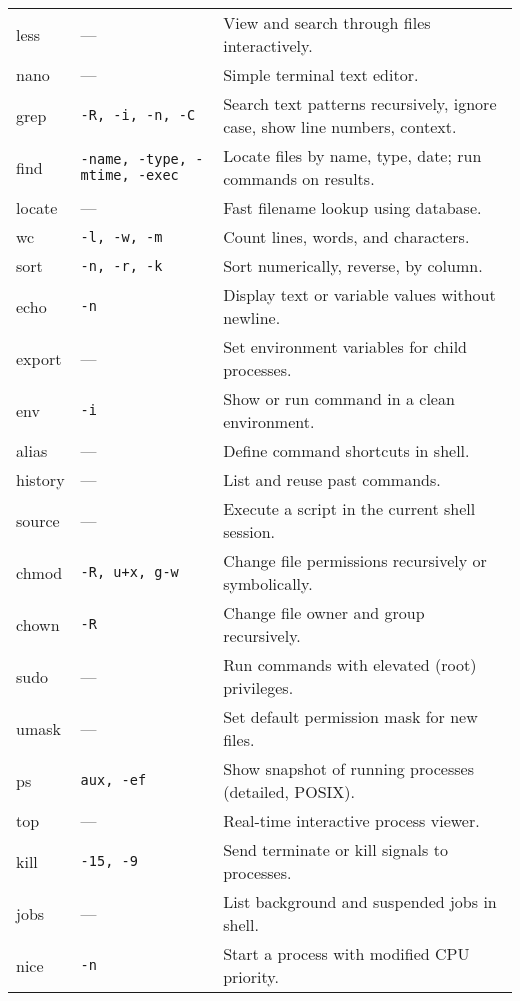 \documentclass[10pt,oneside]{scrbook}
\begin{document}
\begin{longtable}{>{\ttfamily}l l p{4.8cm}}
    less     & —           & View and search through files interactively. \\
    nano     & —           & Simple terminal text editor. \\
    grep     & \texttt{-R, -i, -n, -C} & Search text patterns recursively, ignore case, show line numbers, context. \\
    find     & \texttt{-name, -type, -mtime, -exec} & Locate files by name, type, date; run commands on results. \\
    locate   & —           & Fast filename lookup using database. \\
    wc       & \texttt{-l, -w, -m} & Count lines, words, and characters. \\
    sort     & \texttt{-n, -r, -k} & Sort numerically, reverse, by column. \\
    echo     & \texttt{-n}         & Display text or variable values without newline. \\
    export   & —           & Set environment variables for child processes. \\
    env      & \texttt{-i}         & Show or run command in a clean environment. \\
    alias    & —           & Define command shortcuts in shell. \\
    history  & —           & List and reuse past commands. \\
    source   & —           & Execute a script in the current shell session. \\
    chmod    & \texttt{-R, u+x, g-w} & Change file permissions recursively or symbolically. \\
    chown    & \texttt{-R}         & Change file owner and group recursively. \\
    sudo     & —           & Run commands with elevated (root) privileges. \\
    umask    & —           & Set default permission mask for new files. \\
    ps       & \texttt{aux, -ef}   & Show snapshot of running processes (detailed, POSIX). \\
    top      & —           & Real-time interactive process viewer. \\
    kill     & \texttt{-15, -9}    & Send terminate or kill signals to processes. \\
    jobs     & —           & List background and suspended jobs in shell. \\
    nice     & \texttt{-n}         & Start a process with modified CPU priority. \\

\end{longtable}
\end{document}
